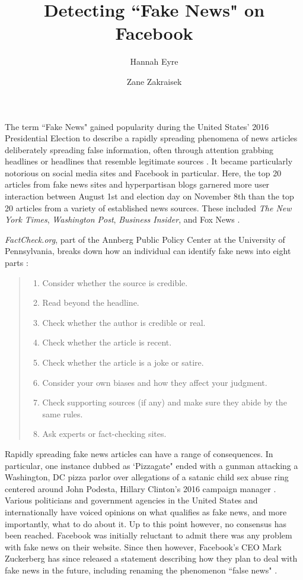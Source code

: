 \documentclass[12pt]{article}
\title{Detecting ``Fake News" on Facebook}
\author{Hannah Eyre \and Zane Zakraisek}
\begin{document}
\maketitle
{}

The term ``Fake News" gained popularity during the United States' 2016 Presidential Election to describe a rapidly spreading phenomena of news articles deliberately spreading false information, often through attention grabbing headlines or headlines that resemble legitimate sources \citep{guardian}. It became particularly notorious on social media sites and Facebook in particular. Here, the top 20 articles from fake news sites and hyperpartisan blogs garnered more user interaction between August 1st and election day on November 8th than the top 20 articles from a variety of established news sources. These included {\it The New York Times}, {\it Washington Post}, {\it Business Insider}, and Fox News \citep{buzzfeed}.

\textit{FactCheck.org}, part of the Annberg Public Policy Center at the University of Pennsylvania, breaks down how an individual can identify fake news into eight parts \citep{factcheck}:
\begin{quote}
\begin{enumerate}
\item Consider whether the source is credible.
\item Read beyond the headline.
\item Check whether the author is credible or real.
\item Check whether the article is recent.
\item Check whether the article is a joke or satire.
\item Consider your own biases and how they affect your judgment.
\item Check supporting sources (if any) and make sure they abide by the same rules.
\item Ask experts or fact-checking sites.
\end{enumerate}
\end{quote}

Rapidly spreading fake news articles can have a range of consequences. In particular, one instance dubbed as `Pizzagate" ended with a gunman attacking a Washington, DC pizza parlor over allegations of a satanic child sex abuse ring centered around John Podesta, Hillary Clinton's 2016 campaign manager \citep{pizzagate}. Various politicians and government agencies in the United States and internationally have voiced opinions on what qualifies as fake news, and more importantly, what to do about it. Up to this point however, no consensus has been reached. Facebook was initially reluctant to admit there was any problem with fake news on their website. Since then however, Facebook's CEO Mark Zuckerberg has since released a statement describing how they plan to deal with fake news in the future, including renaming the phenomenon ``false news" \citep{zuckerberg}.
\end{document}

